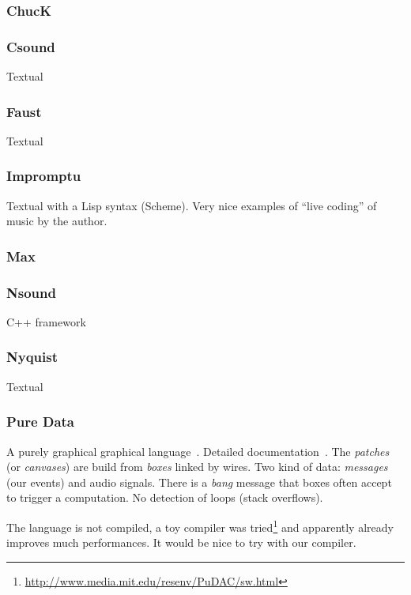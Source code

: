 \documentclass{article}
\begin{document}
\subsubsection{ChucK}

\subsubsection{Csound}
\cite{csound}
Textual

\subsubsection{Faust}
\cite{faust}
Textual

\subsubsection{Impromptu}
\cite{impromptu} Textual with a Lisp syntax (Scheme). Very nice examples of ``live
coding'' of music by the author.

\subsubsection{Max}
\cite{max}

\subsubsection{Nsound}
\cite{nsound} C++ framework

\subsubsection{Nyquist}
\cite{nyquist}
Textual

\subsubsection{Pure Data}
A purely graphical graphical language~\cite{puredata}. Detailed
documentation~\cite{pd-doc}. The \emph{patches} (or \emph{canvases}) are build
from \emph{boxes} linked by wires. Two kind of data: \emph{messages} (our
events) and audio signals. There is a \emph{bang} message that boxes often
accept to trigger a computation. No detection of loops (stack overflows).

The language is not compiled, a toy compiler was
tried\footnote{\url{http://www.media.mit.edu/resenv/PuDAC/sw.html}} and
apparently already improves much performances. It would be nice to try with our compiler.
\end{document}
